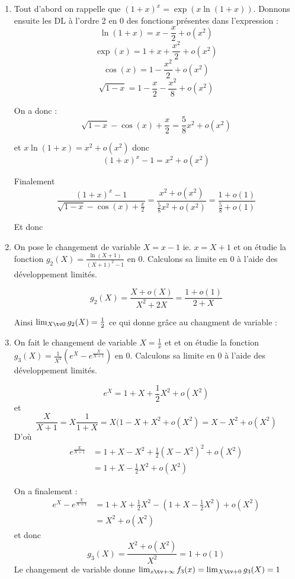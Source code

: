 \documentclass[a4paper, 11pt,reqno]{article}
\begin{document}
\begin{correction}
\begin{enumerate}
\item 
Tout d'abord on rappelle que $(1+x)^x =\exp(x\ln(1+x))$. 
Donnons ensuite les DL à l'ordre 2 en 0 des fonctions présentes dans l'expression : 
$$\ln(1+x)= x -\frac{x}{2}+o(x^2)$$
$$\exp(x) =1+x+\frac{x^2}{2}+o(x^2)$$
$$\cos(x)= 1-\frac{x^2}{2}+o(x^2)$$
$$\sqrt{1-x} = 1-\frac{x}{2}-\frac{x^2}{8} +o(x^2)$$

On a donc : 
$$\sqrt{1-x}-\cos(x) +\frac{x}{2}=  \frac{5}{8}x^2+o(x^2)$$

et 
$x\ln(1+x) =x^2 +o(x^2)$ donc 
$$(1+x)^x-1 =   x^2 +o(x^2)$$

Finalement $$\frac{(1+x)^x-1}{\sqrt{1-x}-\cos(x) +\frac{x}{2}}  = \frac{x^2+o(x^2)}{ \frac{5}{8}x^2+o(x^2)} = \frac{1+o(1)}{ \frac{5}{8}+o(1)} $$

Et donc 

\item  
On pose le changement de variable $X= x-1$  ie. $x=X+1$ et on étudie la fonction $g_2(X) =\frac{\ln(X+1)}{(X+1)^2-1}$ en $0$. Calculons sa limite en $0$ à l'aide des développement limités. 

$$g_2(X) = \frac{X+o(X)}{X^2+2X} = \frac{1+o(1) }{2+X}$$

Ainsi $\lim_{X\tv 0} g_2(X) =\frac{1}{2}$ ce qui donne grâce au changment de variable : 

\item On fait le changement de variable $X=\frac{1}{x}$ et  et on étudie la fonction $g_3(X) =\frac{1}{X^2} ( e^X-e^{\frac{X}{X+1}}) $ en $0$. Calculons sa limite en $0$ à l'aide des développement limités. 

$$e^{X} =1 +X+\frac{1}{2}X^2 +o(X^2)$$
et 
$$\frac{X}{X+1} = X \frac{1}{1+X} = X (1-X+X^2 +o(X^2) = X-X^2 +o(X^2)$$
 D'où 
 \begin{align*}
 e^{\frac{X}{X+1}} &= 1 + X-X^2 +\frac{1}{2} \left(  X-X^2 \right)^2+o(X^2) \\
 							&= 1 +X -\frac{1}{2}X^2+o(X^2)
 \end{align*}

On a finalement :
\begin{align*}
e^X-e^{\frac{X}{X+1}} &= 1 +X+\frac{1}{2}X^2 - ( 1 +X -\frac{1}{2}X^2) +o(X^2) \\						&= X^2 +o(X^2) 				
\end{align*}
et donc 
$$g_3(X) =\frac{X^2+o(X^2)}{X^2} =1+o(1)$$
Le changement de variable donne 
$\lim_{x\tv +\infty} f_3(x) =\lim_{X\tv+0 } g_3(X)  =1$



\end{enumerate}

\end{correction}
\end{document}
